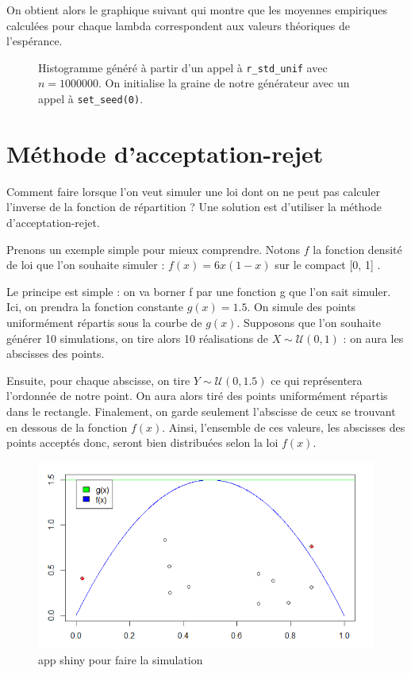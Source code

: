 \documentclass[10pt]{article} %
\begin{document}
On obtient alors le graphique suivant qui montre que les moyennes empiriques calculées pour chaque lambda correspondent aux valeurs théoriques de l'espérance.
\begin{figure}[h!]
    \centering
    

    \vspace{-1cm}
    \caption{Histogramme généré à partir d'un appel à \texttt{r\_std\_unif} avec $n = 1000000$. On initialise la graine de notre
    générateur avec un appel à \texttt{set\_seed(0)}.}

\end{figure}






\section{Méthode d'acceptation-rejet}

Comment faire lorsque l'on veut simuler une loi dont on ne peut pas calculer l'inverse de la fonction de répartition ? Une solution est d'utiliser la méthode d'acceptation-rejet.

Prenons un exemple simple pour mieux comprendre. Notons $f$ la fonction densité de loi que l'on souhaite simuler : $f(x) = 6x(1-x) $ sur le compact [0, 1] .

Le principe est simple : on va borner f par une fonction g que l'on sait simuler. Ici, on prendra la fonction constante $g(x) = 1.5 $. On simule des points uniformément répartis sous la courbe de $g(x)$. Supposons que l'on souhaite générer 10 simulations, on tire alors 10 réalisations de $X \sim \mathcal{U}(0, 1)$ : on aura les abscisses des points.

Ensuite, pour chaque abscisse, on tire $Y \sim \mathcal{U}(0, 1.5)$ ce qui représentera l'ordonnée de notre point. On aura alors tiré des points uniformément répartis dans le rectangle. Finalement, on garde seulement l'abscisse de ceux se trouvant en dessous de la fonction $f(x)$. Ainsi, l'ensemble de ces valeurs, les abscisses des points acceptés donc, seront bien distribuées selon la loi $f(x)$.

\newpage
\begin{figure}[h!]
\centering
\includegraphics[width=\linewidth]{media/graph_acceptation_rejet.png}

\caption{app shiny pour faire la simulation}
\end{figure}
\end{document}
